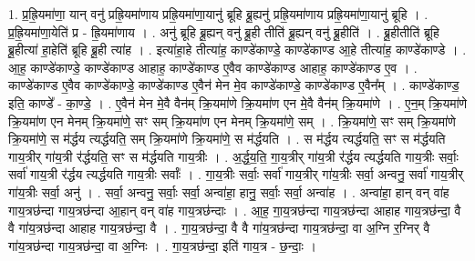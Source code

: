 \documentclass[17pt]{extarticle}
\begin{document}
1. प्र॒ह्रि॒यमा॑णा॒ यान् वनु॑ प्रह्रि॒यमा॑णाय प्रह्रि॒यमा॑णा॒यानु॑ ब्रूहि ब्रू॒ह्यनु॑ प्रह्रि॒यमा॑णाय प्रह्रि॒यमा॑णा॒यानु॑ ब्रूहि । . प्र॒ह्रि॒यमा॑णा॒येति॑ प्र - ह्रि॒यमा॑णाय । . अनु॑ ब्रूहि ब्रू॒ह्यन् वनु॑ ब्रू॒ही तीति॑ ब्रू॒ह्यन् वनु॑ ब्रू॒हीति॑ । . ब्रू॒हीतीति॑ ब्रूहि ब्रू॒हीत्या॑ हा॒हेति॑ ब्रूहि ब्रू॒ही त्या॑ह । . इत्या॑हा॒हे तीत्या॑ह॒ काण्डे॑काण्डे॒ काण्डे॑काण्ड आ॒हे तीत्या॑ह॒ काण्डे॑काण्डे । . आ॒ह॒ काण्डे॑काण्डे॒ काण्डे॑काण्ड आहाह॒ काण्डे॑काण्ड ए॒वैव काण्डे॑काण्ड आहाह॒ काण्डे॑काण्ड ए॒व । . काण्डे॑काण्ड ए॒वैव काण्डे॑काण्डे॒ काण्डे॑काण्ड ए॒वैन॑ मेन मे॒व काण्डे॑काण्डे॒ काण्डे॑काण्ड ए॒वैन᳚म् । . काण्डे॑काण्ड॒ इति॒ काण्डे᳚ - का॒ण्डे॒ । . ए॒वैन॑ मेन मे॒वै वैन॑म् क्रि॒यमा॑णे क्रि॒यमा॑ण एन मे॒वै वैन॑म् क्रि॒यमा॑णे । . ए॒न॒म् क्रि॒यमा॑णे क्रि॒यमा॑ण एन मेनम् क्रि॒यमा॑णे॒ सꣳ सम् क्रि॒यमा॑ण एन मेनम् क्रि॒यमा॑णे॒ सम् । . क्रि॒यमा॑णे॒ सꣳ सम् क्रि॒यमा॑णे क्रि॒यमा॑णे॒ स म॑र्द्धय त्यर्द्धयति॒ सम् क्रि॒यमा॑णे क्रि॒यमा॑णे॒ स म॑र्द्धयति । . स म॑र्द्धय त्यर्द्धयति॒ सꣳ स म॑र्द्धयति गाय॒त्रीर् गा॑य॒त्री र॑र्द्धयति॒ सꣳ स म॑र्द्धयति गाय॒त्रीः । . अ॒र्द्ध॒य॒ति॒ गा॒य॒त्रीर् गा॑य॒त्री र॑र्द्धय त्यर्द्धयति गाय॒त्रीः सर्वाः॒ सर्वा॑ गाय॒त्री र॑र्द्धय त्यर्द्धयति गाय॒त्रीः सर्वाः᳚ । . गा॒य॒त्रीः सर्वाः॒ सर्वा॑ गाय॒त्रीर् गा॑य॒त्रीः सर्वा॒ अन्वनु॒ सर्वा॑ गाय॒त्रीर् गा॑य॒त्रीः सर्वा॒ अनु॑ । . सर्वा॒ अन्वनु॒ सर्वाः॒ सर्वा॒ अन्वा॑हा॒ हानु॒ सर्वाः॒ सर्वा॒ अन्वा॑ह । . अन्वा॑हा॒ हान् वन् वा॑ह गाय॒त्रछ॑न्दा गाय॒त्रछ॑न्दा आ॒हान् वन् वा॑ह गाय॒त्रछ॑न्दाः । . आ॒ह॒ गा॒य॒त्रछ॑न्दा गाय॒त्रछ॑न्दा आहाह गाय॒त्रछ॑न्दा॒ वै वै गा॑य॒त्रछ॑न्दा आहाह गाय॒त्रछ॑न्दा॒ वै । . गा॒य॒त्रछ॑न्दा॒ वै वै गा॑य॒त्रछ॑न्दा गाय॒त्रछ॑न्दा॒ वा अ॒ग्नि र॒ग्निर् वै गा॑य॒त्रछ॑न्दा गाय॒त्रछ॑न्दा॒ वा अ॒ग्निः । . गा॒य॒त्रछ॑न्दा॒ इति॑ गाय॒त्र - छ॒न्दाः॒ । \newline
\end{document}
